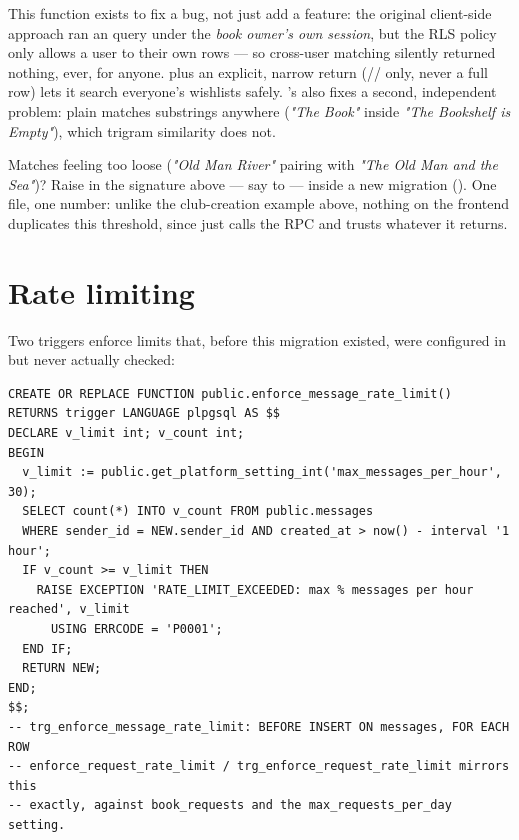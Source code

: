 This function exists to fix a bug, not just add a feature: the original client-side approach ran an  query under the \emph{book owner's own session}, but the  RLS policy only allows a user to  their own rows — so cross-user matching silently returned nothing, ever, for anyone.  plus an explicit, narrow return (// only, never a full row) lets it search everyone's wishlists safely. 's  also fixes a second, independent problem: plain  matches substrings anywhere (\emph{"The Book"} inside \emph{"The Bookshelf is Empty"}), which trigram similarity does not.

\begin{olkhowto}
Matches feeling too loose (\emph{"Old Man River"} pairing with \emph{"The Old Man and the Sea"})? Raise  in the  signature above — say to  — inside a new migration (). One file, one number: unlike the club-creation example above, nothing on the frontend duplicates this threshold, since  just calls the RPC and trusts whatever it returns.
\end{olkhowto}

\section{Rate limiting}

Two  triggers enforce limits that, before this migration existed, were configured in  but never actually checked:

\begin{lstlisting}[style=olkcodesql, caption={enforce\_message\_rate\_limit — reads its own limit from platform\_settings}]
CREATE OR REPLACE FUNCTION public.enforce_message_rate_limit()
RETURNS trigger LANGUAGE plpgsql AS $$
DECLARE v_limit int; v_count int;
BEGIN
  v_limit := public.get_platform_setting_int('max_messages_per_hour', 30);
  SELECT count(*) INTO v_count FROM public.messages
  WHERE sender_id = NEW.sender_id AND created_at > now() - interval '1 hour';
  IF v_count >= v_limit THEN
    RAISE EXCEPTION 'RATE_LIMIT_EXCEEDED: max % messages per hour reached', v_limit
      USING ERRCODE = 'P0001';
  END IF;
  RETURN NEW;
END;
$$;
-- trg_enforce_message_rate_limit: BEFORE INSERT ON messages, FOR EACH ROW
-- enforce_request_rate_limit / trg_enforce_request_rate_limit mirrors this
-- exactly, against book_requests and the max_requests_per_day setting.
\end{lstlisting}

